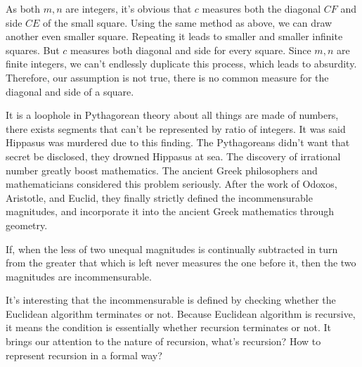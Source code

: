 \documentclass[b5paper]{article}
\begin{document}
As both $m, n$ are integers, it's obvious that $c$ measures both the diagonal $CF$ and side $CE$ of the small square. Using the same method as above, we can draw another even smaller square. Repeating it leads to smaller and smaller infinite squares. But $c$ measures both diagonal and side for every square. Since $m, n$ are finite integers, we can't endlessly duplicate this process, which leads to absurdity. Therefore, our assumption is not true, there is no common measure for the diagonal and side of a square.

It is a loophole in Pythagorean theory about all things are made of numbers, there exists segments that can't be represented by ratio of integers. It was said Hippasus was murdered due to this finding. The Pythagoreans didn't want that secret be disclosed, they drowned Hippasus at sea. The discovery of irrational number greatly boost mathematics. The ancient Greek philosophers and mathematicians considered this problem seriously. After the work of Odoxos, Aristotle, and Euclid, they finally strictly defined the incommensurable magnitudes, and incorporate it into the ancient Greek mathematics through geometry.

\begin{proposition}
If, when the less of two unequal magnitudes is continually subtracted in turn from the greater that which is left never measures the one before it, then the two magnitudes are incommensurable.
\end{proposition}

It's interesting that the incommensurable is defined by checking whether the Euclidean algorithm terminates or not. Because Euclidean algorithm is recursive, it means the condition is essentially whether recursion terminates or not. It brings our attention to the nature of recursion, what's recursion? How to represent recursion in a formal way?
\end{document}
